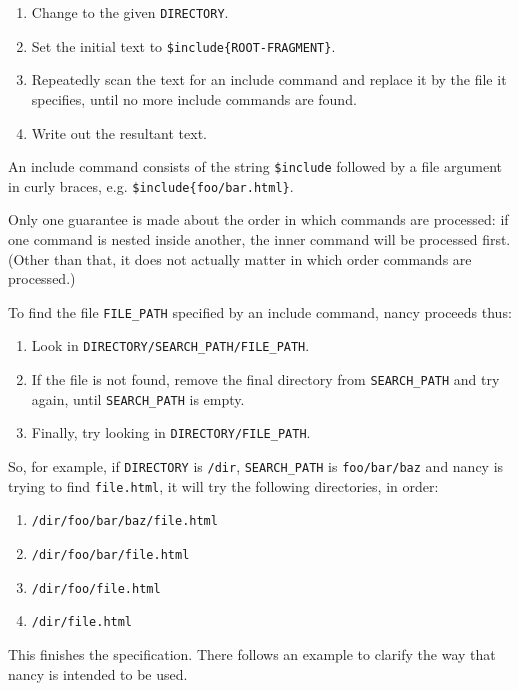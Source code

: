 \documentclass[english]{scrartcl}
\begin{document}
\begin{enumerate}
\item Change to the given \texttt{DIRECTORY}.
\item Set the initial text to \texttt{\$include\{ROOT-FRAGMENT\}}.
\item Repeatedly scan the text for an include command and replace it
  by the file it specifies, until no more include commands are
  found.\item Write out the resultant text.
\end{enumerate}

An include command consists of the string \texttt{\$include} followed
by a file argument in curly braces, e.g.
\texttt{\$include\{foo/bar.html\}}.

Only one guarantee is made about the order in which commands are
processed: if one command is nested inside another, the inner command
will be processed first. (Other than that, it does not actually matter
in which order commands are processed.)

To find the file \texttt{FILE\_PATH} specified by an include command,
nancy proceeds thus:

\begin{enumerate}
\item Look in \texttt{DIRECTORY/SEARCH\_PATH/FILE\_PATH}.
\item If the file is not found, remove the final directory from
  \texttt{SEARCH\_PATH} and try again, until \texttt{SEARCH\_PATH} is
  empty.\item Finally, try looking in \texttt{DIRECTORY/FILE\_PATH}.
\end{enumerate}

So, for example, if \texttt{DIRECTORY} is \texttt{/dir},
\texttt{SEARCH\_PATH} is \texttt{foo/bar/baz} and nancy is trying to
find \texttt{file.html}, it will try the following directories, in
order:

\begin{enumerate}
\item \texttt{/dir/foo/bar/baz/file.html}
\item \texttt{/dir/foo/bar/file.html}
\item \texttt{/dir/foo/file.html}
\item \texttt{/dir/file.html}
\end{enumerate}

This finishes the specification. There follows an example to clarify
the way that nancy is intended to be used.
\end{document}
